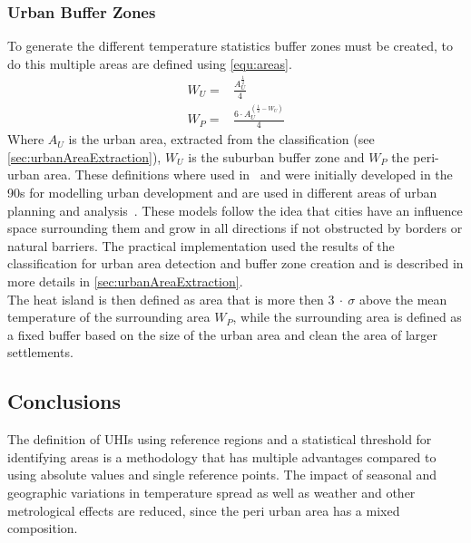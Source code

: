 \documentclass[12pt,a4paper, english,twoside]{scrartcl}
\begin{document}
    \subsubsection{Urban Buffer Zones}\label{sec:urbanBufferzone}
      To generate the different temperature statistics buffer zones must be created, to do this multiple areas are defined using \cref{equ:areas}.
      \begin{equation}\label{equ:areas}
        \begin{split}
          W_U = & \frac{A_U^{\frac{1}{2}}}{4} \\
          W_P = & \frac{6\cdot A_U^{(\frac{1}{2}-W_U)}}{4}
        \end{split}
      \end{equation}
      Where $A_U$ is the urban area, extracted from the classification (see \cref{sec:urbanAreaExtraction}), $W_U$ is the suburban buffer zone and $W_P$ the peri-urban area.
      These definitions where used in~\cite{Sobrino2020} and were initially developed in the 90s for modelling urban development and are used in different areas of urban planning and analysis~\autocite[see]{AlkanBala2014}.
      These models follow the idea that cities have an influence space surrounding them and grow in all directions if not obstructed by borders or natural barriers. 
      The practical implementation used the results of the classification for urban area detection and buffer zone creation and is described in more details in \cref{sec:urbanAreaExtraction}. \\
      The heat island is then defined as area that is more then $3~\cdot~\sigma$ above the mean temperature of the surrounding area $W_P$, while the surrounding area is defined as a fixed buffer based on the size of the urban area and clean the area of larger settlements. 
    \subsection{Conclusions}
    The definition of \glspl{UHI} using reference regions and a statistical threshold for identifying areas is a methodology that has multiple advantages compared to using absolute values and single reference points. 
    The impact of seasonal and geographic variations in temperature spread as well as weather and other metrological effects are reduced, since the peri urban area has a mixed composition. 

\newpage
\end{document}
